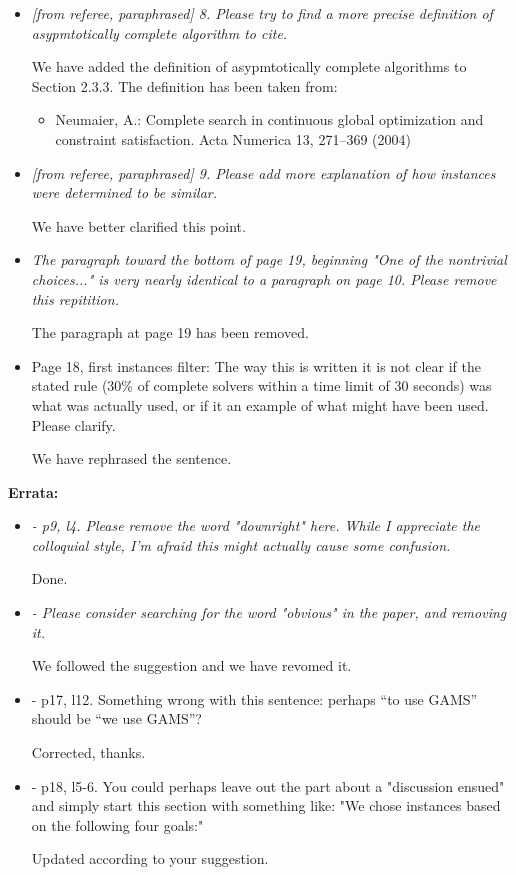 \documentclass[11pt]{article}
\newcommand{\rep}[1]{{\textcolor{acblue}{#1}}}
\begin{document}
\begin{itemize}
\item 
{\it
[from referee, paraphrased] 8. Please try to find a more precise definition of asypmtotically complete algorithm to 
cite.
} 

\rep{We have added the definition of asypmtotically complete algorithms to Section 2.3.3. The definition has been taken from: 
\begin{itemize}
\item Neumaier, A.: Complete search in continuous global optimization and
constraint satisfaction. Acta Numerica 13, 271–369 (2004)
\end{itemize}
}

\item 
{\it
[from referee, paraphrased] 9. Please add more explanation of how instances were determined to be similar. 
}

\rep{We have better clarified this point.}


\item 
{\it
The paragraph toward the bottom of page 19, beginning "One of the nontrivial choices..." is very nearly identical to a paragraph on page 10. Please remove this repitition. 
}

\rep{The paragraph at page 19 has been removed.}


\item Page 18, first instances filter: The way this is written it is not clear if the stated rule (30\% of complete solvers within a time limit of 30 seconds) was what was actually used, or if it an example of what might have been used. Please clarify. 

\rep{We have rephrased the sentence.}

 
\end{itemize}

\bigskip
\textbf{Errata:}

 \begin{itemize}
 
\item 
{\it
- p9, l4. Please remove the word "downright" here. While I appreciate the colloquial style, I'm afraid this might actually cause some confusion. 
}

\rep{Done.}

\item 
{\it
- Please consider searching for the word "obvious" in the paper, and removing it. 
}

\rep{We followed the suggestion and we have revomed it.}

\item 
{\it

- p17, l12. Something wrong with this sentence: perhaps ``to use GAMS'' should be ``we use GAMS''? 
}

\rep{Corrected, thanks.}

\item 
{\it

- p18, l5-6. You could perhaps leave out the part about a "discussion ensued" and simply start this section with something like: "We chose instances based on the following four goals:" 
}

\rep{Updated according to your suggestion.}

 
\end{itemize}
\end{document}
